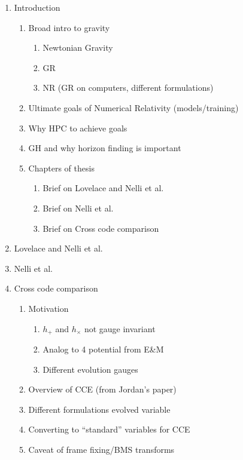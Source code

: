 \documentclass[12pt]{caltech_thesis}
\begin{document}
\begin{enumerate}
   \item Introduction
   \begin{enumerate}
      \item Broad intro to gravity
      \begin{enumerate}
         \item Newtonian Gravity
         \item GR
         \item NR (GR on computers, different formulations)
      \end{enumerate}
      \item Ultimate goals of Numerical Relativity (models/training)
      \item Why HPC to achieve goals
      \item GH and why horizon finding is important
      \item Chapters of thesis
      \begin{enumerate}
         \item Brief on Lovelace and Nelli et al.
         \item Brief on Nelli et al.
         \item Brief on Cross code comparison
      \end{enumerate}
   \end{enumerate}
   \item Lovelace and Nelli et al.
   \item Nelli et al.
   \item Cross code comparison
   \begin{enumerate}
      \item Motivation
      \begin{enumerate}
         \item $h_{+}$ and $h_{\times}$ not gauge invariant
         \item Analog to 4 potential from E\&M
         \item Different evolution gauges
      \end{enumerate}
      \item Overview of CCE (from Jordan's paper)
      \item Different formulations evolved variable
      \item Converting to ``standard'' variables for CCE
      \item Caveat of frame fixing/BMS transforms
   \end{enumerate}
\end{enumerate}
\end{document}
